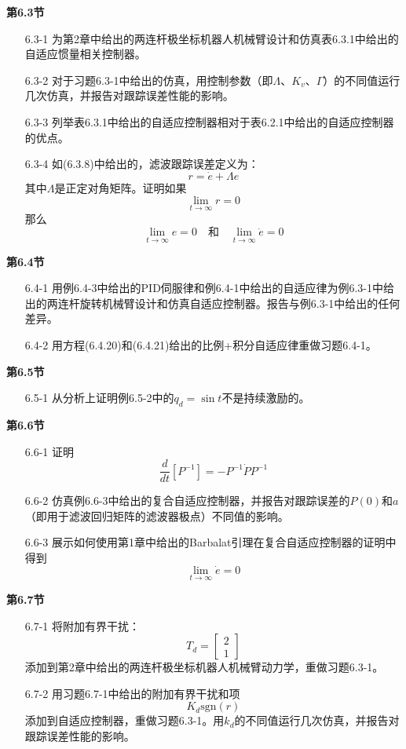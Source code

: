 \documentclass[12pt,a4paper]{ctexart}
\begin{document}
\textbf{第6.3节}

\begin{enumerate}
\item[6.3-1] 为第2章中给出的两连杆极坐标机器人机械臂设计和仿真表6.3.1中给出的自适应惯量相关控制器。

\item[6.3-2] 对于习题6.3-1中给出的仿真，用控制参数（即$\Lambda$、$K_v$、$\Gamma$）的不同值运行几次仿真，并报告对跟踪误差性能的影响。

\item[6.3-3] 列举表6.3.1中给出的自适应控制器相对于表6.2.1中给出的自适应控制器的优点。

\item[6.3-4] 如(6.3.8)中给出的，滤波跟踪误差定义为：
\[
r = \dot{e} + \Lambda e
\]
其中$\Lambda$是正定对角矩阵。证明如果
\[
\lim_{t \to \infty} r = 0
\]
那么
\[
\lim_{t \to \infty} e = 0 \quad \text{和} \quad \lim_{t \to \infty} \dot{e} = 0
\]
\end{enumerate}

\textbf{第6.4节}

\begin{enumerate}
\item[6.4-1] 用例6.4-3中给出的PID伺服律和例6.4-1中给出的自适应律为例6.3-1中给出的两连杆旋转机械臂设计和仿真自适应控制器。报告与例6.3-1中给出的任何差异。

\item[6.4-2] 用方程(6.4.20)和(6.4.21)给出的比例+积分自适应律重做习题6.4-1。
\end{enumerate}

\textbf{第6.5节}

\begin{enumerate}
\item[6.5-1] 从分析上证明例6.5-2中的$q_d = \sin t$不是持续激励的。
\end{enumerate}

\textbf{第6.6节}

\begin{enumerate}
\item[6.6-1] 证明
\[
\frac{d}{dt}[P^{-1}] = -P^{-1}\dot{P}P^{-1}
\]

\item[6.6-2] 仿真例6.6-3中给出的复合自适应控制器，并报告对跟踪误差的$P(0)$和$a$（即用于滤波回归矩阵的滤波器极点）不同值的影响。

\item[6.6-3] 展示如何使用第1章中给出的Barbalat引理在复合自适应控制器的证明中得到
\[
\lim_{t \to \infty} \dot{e} = 0
\]
\end{enumerate}

\textbf{第6.7节}

\begin{enumerate}
\item[6.7-1] 将附加有界干扰：
\[
T_d = \begin{bmatrix} 2 \\ 1 \end{bmatrix}
\]
添加到第2章中给出的两连杆极坐标机器人机械臂动力学，重做习题6.3-1。

\item[6.7-2] 用习题6.7-1中给出的附加有界干扰和项
\[
K_d \text{sgn}(r)
\]
添加到自适应控制器，重做习题6.3-1。用$k_d$的不同值运行几次仿真，并报告对跟踪误差性能的影响。
\end{enumerate}

\ifstandalone
  
\end{document}

